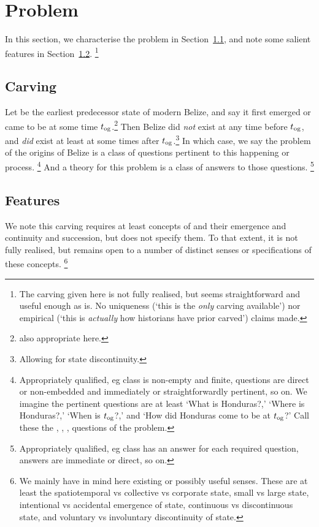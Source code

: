 \section{Problem}
\label{s:problem}
	In this section, we characterise the problem in Section~\ref{ss:carving}, and note some salient features in Section~\ref{ss:features}.%
	\footnote{The carving given here is not fully realised, but seems straightforward and useful enough as is. No uniqueness (`this is the \emph{only} carving available') nor empirical (`this is \emph{actually} how historians have prior carved') claims made.}
	\subsection{Carving}
	\label{ss:carving}
		Let  be the earliest predecessor state of modern Belize, and say it first emerged or came to be at some time \(t_{\operatorname{og}}\).\footnote{ also appropriate here.} Then Belize did \emph{not} exist at any time before \(t_{\operatorname{og}}\), and \emph{did} exist at least at some times after \(t_{\operatorname{og}}\).\footnote{Allowing for state discontinuity.} In which case, we say the problem of the origins of Belize is a class of questions pertinent to this happening or process.%
		\footnote{Appropriately qualified, eg class is non-empty and finite, questions are direct or non-embedded and immediately or straightforwardly pertinent, so on. We imagine the pertinent questions are at least `What is Honduras?,' `Where is Honduras?,' `When is \(t_{\operatorname{og}}\)?,' and `How did Honduras come to be at \(t_{\operatorname{og}}\)?' Call these the , , ,  questions of the problem.}
		And a theory for this problem is a class of answers to those questions.%
		\footnote{Appropriately qualified, eg class has an answer for each required question, answers are immediate or direct, so on.}
	\subsection{Features}
	\label{ss:features}
		We note this carving requires at least concepts of  and their emergence and continuity and succession, but does not specify them. To that extent, it is not fully realised, but remains open to a number of distinct senses or specifications of these concepts.%
		\footnote{We mainly have in mind here existing or possibly useful senses. These are at least the spatiotemporal vs collective vs corporate state, small vs large state, intentional vs accidental emergence of state, continuous vs discontinuous state, and voluntary vs involuntary discontinuity of state.}
	
